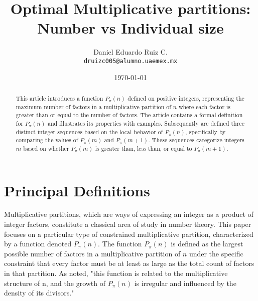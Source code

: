 \documentclass[]{article}
\title{Optimal Multiplicative partitions: Number vs Individual size}
\author{Daniel Eduardo Ruiz C. \\ \texttt{druizc005@alumno.uaemex.mx}}
\date{\today}
\theoremstyle{plain}%
\theoremstyle{definition}
\theoremstyle{remark}
\begin{document}
\maketitle


\begin{abstract}
	This article introduces a function $P_{\pi}(n)$ defined on positive integers, representing the maximum number of factors in a multiplicative partition of $n$ where each factor is greater than or equal to the number of factors. The article contains a formal definition for $P_{\pi}(n)$ and illustrates its properties with examples. Subsequently are defined three distinct integer sequences based on the local behavior of $P_{\pi}(n)$, specifically by comparing the values of $P_{\pi}(m)$ and $P_{\pi}(m+1)$. These sequences categorize integers $m$ based on whether $P_{\pi}(m)$ is greater than, less than, or equal to $P_{\pi}(m+1)$.
\end{abstract}

\tableofcontents

\section{Principal Definitions}

Multiplicative partitions, which are ways of expressing an integer as a product of integer factors, constitute a classical area of study in number theory. This paper focuses on a particular type of constrained multiplicative partition, characterized by a function denoted $P_{\pi}(n)$. The function $P_{\pi}(n)$ is defined as the largest possible number of factors in a multiplicative partition of $n$ under the specific constraint that every factor must be at least as large as the total count of factors in that partition. As noted, "this function is related to the multiplicative structure of n, and the growth of $P_{\pi}(n)$ is irregular and influenced by the density of its divisors."
\end{document}

